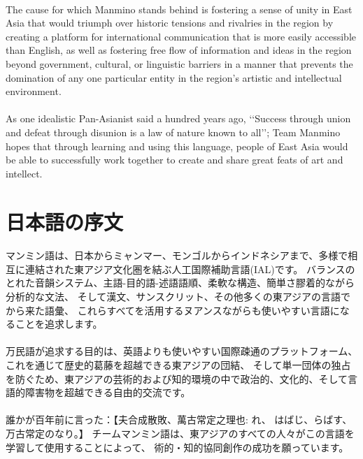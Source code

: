 \documentclass{book}
\begin{document}
        \paragraph{}
        The cause for which Manmino stands behind is fostering a sense of unity in East Asia that would triumph over historic tensions and rivalries in the region by creating a platform for international communication that is more easily accessible than English, 
        as well as fostering free flow of information and ideas in the region beyond government, cultural, or linguistic barriers in a manner that prevents the domination of any one particular entity in the region's artistic and intellectual environment.
        \paragraph{}
        As one idealistic Pan-Asianist said a hundred years ago, \lq\lq Success through union and defeat through disunion is a law of nature known to all\rq\rq; 
        Team Manmino hopes that through learning and using this language, people of East Asia would be able to successfully work together to create and share great feats of art and intellect. 
    \section{日本語の序文}
        \paragraph{}
        マンミン語は、日本からミャンマー、モンゴルからインドネシアまで、多様で相互に連結された東アジア文化圏を結ぶ人工国際補助言語(IAL)です。
        バランスのとれた音韻システム、主語-目的語-述語語順、柔軟な構造、簡単さ膠着的ながら分析的な文法、
        そして漢文、サンスクリット、その他多くの東アジアの言語でから来た語彙、
        これらすべてを活用するヌアンスながらも使いやすい言語になることを追求します。
        \paragraph{}
        万民語が追求する目的は、英語よりも使いやすい国際疎通のプラットフォーム、これを通じて歴史的葛藤を超越できる東アジアの団結、
        そして単一団体の独占を防ぐため、東アジアの芸術的および知的環境の中で政治的、文化的、そして言語的障害物を超越できる自由的交流です。
        \paragraph{}
        誰かが百年前に言った：【夫合成散敗、萬古常定之理也: れ\vspace{5pt}、
        はばじ、らばす、万古常定のなり。】 
        チームマンミン語は、東アジアのすべての人々がこの言語を学習して使用することによって、
        術的・知的協同創作の成功を願っています。
        \vfill \newpage
\end{document}
